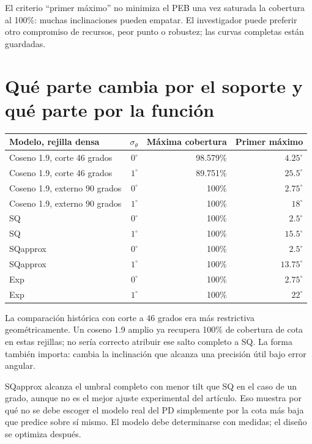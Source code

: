 \documentclass[11pt,a4paper]{article}
\begin{document}
El criterio ``primer máximo'' no minimiza el PEB una vez saturada la cobertura al 100\%: muchas inclinaciones pueden empatar. El investigador puede preferir otro compromiso de recursos, peor punto o robustez; las curvas completas están guardadas.

\section{Qué parte cambia por el soporte y qué parte por la función}
\begin{center}\small
\begin{tabular}{lrrr}
\toprule Modelo, rejilla densa & $\sigma_\theta$ & Máxima cobertura & Primer máximo \\
\midrule
Coseno 1.9, corte 46 grados & $0^\circ$ & 98.579\% & $4.25^\circ$ \\
Coseno 1.9, corte 46 grados & $1^\circ$ & 89.751\% & $25.5^\circ$ \\
Coseno 1.9, externo 90 grados & $0^\circ$ & 100\% & $2.75^\circ$ \\
Coseno 1.9, externo 90 grados & $1^\circ$ & 100\% & $18^\circ$ \\
SQ & $0^\circ$ & 100\% & $2.5^\circ$ \\
SQ & $1^\circ$ & 100\% & $15.5^\circ$ \\
SQapprox & $0^\circ$ & 100\% & $2.5^\circ$ \\
SQapprox & $1^\circ$ & 100\% & $13.75^\circ$ \\
Exp & $0^\circ$ & 100\% & $2.75^\circ$ \\
Exp & $1^\circ$ & 100\% & $22^\circ$ \\
\bottomrule
\end{tabular}
\end{center}
La comparación histórica con corte a 46 grados era más restrictiva geométricamente. Un coseno 1.9 amplio ya recupera 100\% de cobertura de cota en estas rejillas; no sería correcto atribuir ese salto completo a SQ. La forma también importa: cambia la inclinación que alcanza una precisión útil bajo error angular.

SQapprox alcanza el umbral completo con menor tilt que SQ en el caso de un grado, aunque no es el mejor ajuste experimental del artículo. Eso muestra por qué no se debe escoger el modelo real del PD simplemente por la cota más baja que predice sobre sí mismo. El modelo debe determinarse con medidas; el diseño se optimiza después.
\end{document}
